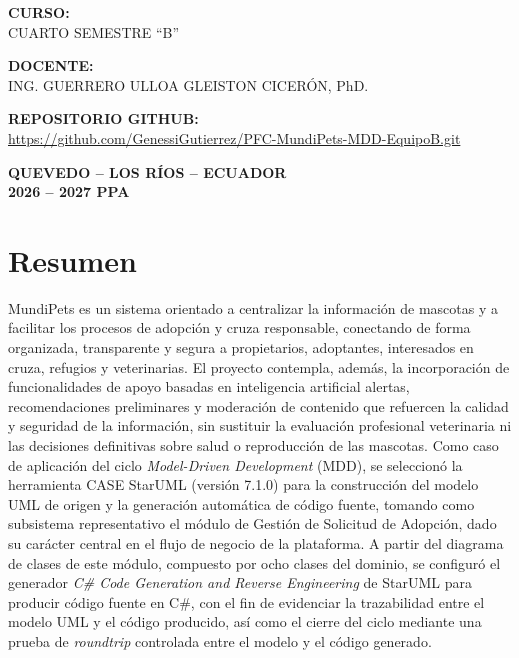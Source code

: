 \documentclass[journal,onecolumn]{IEEEtran}
\begin{document}
\begin{titlepage}
	{\normalsize\bfseries CURSO:}\\[4pt]
	{\normalsize CUARTO SEMESTRE \enquote{B}}
	\vspace{0.5cm}
	
	{\normalsize\bfseries DOCENTE:}\\[4pt]
	{\normalsize ING. GUERRERO ULLOA GLEISTON CICERÓN, PhD.}
	\vspace{0.5cm}
	
	 \quad\textbf{REPOSITORIO GITHUB:}\\
	\url{https://github.com/GenessiGutierrez/PFC-MundiPets-MDD-EquipoB.git}
	\vspace{0.5cm}
	
	{\normalsize\bfseries QUEVEDO -- LOS RÍOS -- ECUADOR}\\[4pt]
	{\normalsize\bfseries 2026 -- 2027 PPA}
	
\end{titlepage}
\tableofcontents
\listoffigures
\listoftables


\section{Resumen}
MundiPets es un sistema orientado a centralizar la información de mascotas y a facilitar los procesos de adopción y cruza responsable, conectando de forma organizada, transparente y segura a propietarios, adoptantes, interesados en cruza, refugios y veterinarias. El proyecto contempla, además, la incorporación de funcionalidades de apoyo basadas en inteligencia artificial alertas, recomendaciones preliminares y moderación de contenido que refuercen la calidad y seguridad de la información, sin sustituir la evaluación profesional veterinaria ni las decisiones definitivas sobre salud o reproducción de las mascotas.
Como caso de aplicación del ciclo \textit{Model-Driven Development} (MDD), se seleccionó la herramienta CASE StarUML (versión 7.1.0) para la construcción del modelo UML de origen y la generación automática de código fuente, tomando como subsistema representativo el módulo de Gestión de Solicitud de Adopción, dado su carácter central en el flujo de negocio de la plataforma. A partir del diagrama de clases de este módulo, compuesto por ocho clases del dominio, se configuró el generador \textit{C\# Code Generation and Reverse Engineering} de StarUML para producir código fuente en C\#, con el fin de evidenciar la trazabilidad entre el modelo UML y el código producido, así como el cierre del ciclo mediante una prueba de \textit{roundtrip} controlada entre el modelo y el código generado.
\end{document}
